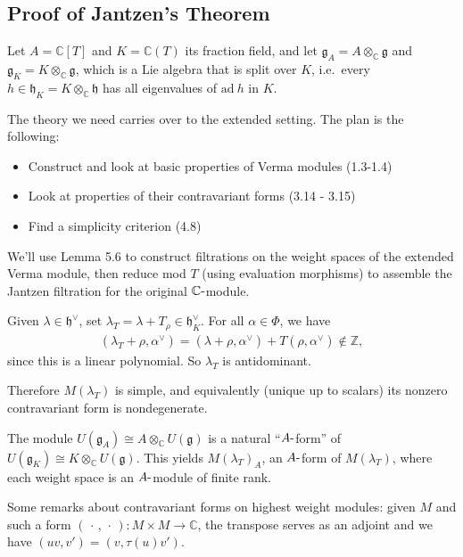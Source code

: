 \documentclass[11pt]{scrartcl}
\theoremstyle{definition}
\theoremstyle{theorem}
\theoremstyle{proof}
\theoremstyle{definition}
\theoremstyle{break}
\theoremstyle{problem}
\providecommand{\tightlist}{%
  \setlength{\itemsep}{0pt}\setlength{\parskip}{0pt}}
\newcommand{\CC}[0]{{\mathbb{C}}}
\newcommand{\ZZ}[0]{{\mathbb{Z}}}
\newcommand{\ad}[0]{\mathrm{ad}~}
\newcommand{\cross}[0]{\times}
\newcommand{\dash}[0]{{\hbox{-}}}
\newcommand{\dual}[0]{^\vee}
\newcommand{\lieg}[0]{{\mathfrak{g}}}
\newcommand{\lieh}[0]{{\mathfrak{h}}}
\newcommand{\tensor}[0]{\otimes}
\newcommand{\wait}[0]{{\,\cdot\,}}
\renewcommand{\to}[0]{\longrightarrow}
\begin{document}
\hypertarget{proof-of-jantzens-theorem}{%
\subsection{Proof of Jantzen's
Theorem}\label{proof-of-jantzens-theorem}}

Let \(A = \CC[T]\) and \(K = \CC(T)\) its fraction field, and let
\(\lieg_A = A \tensor_\CC \lieg\) and \(\lieg_K = K \tensor_\CC \lieg\),
which is a Lie algebra that is split over \(K\), i.e.~every
\(h\in \lieh_K = K \tensor_\CC \lieh\) has all eigenvalues of \(\ad h\)
in \(K\).

The theory we need carries over to the extended setting. The plan is the
following:

\begin{itemize}
\tightlist
\item
  Construct and look at basic properties of Verma modules (1.3-1.4)
\item
  Look at properties of their contravariant forms (3.14 - 3.15)
\item
  Find a simplicity criterion (4.8)
\end{itemize}

We'll use Lemma 5.6 to construct filtrations on the weight spaces of the
extended Verma module, then reduce mod \(T\) (using evaluation
morphisms) to assemble the Jantzen filtration for the original
\(\CC\dash\)module.

Given \(\lambda \in \lieh\dual\), set
\(\lambda_T = \lambda + T_\rho \in \lieh_K\dual\). For all
\(\alpha\in \Phi\), we have \begin{align*}
(\lambda_T  + \rho, \alpha\dual) =
(\lambda + \rho , \alpha\dual) + T(\rho, \alpha\dual) \not\in \ZZ
,\end{align*} since this is a linear polynomial. So \(\lambda_T\) is
antidominant.

Therefore \(M(\lambda_T)\) is simple, and equivalently (unique up to
scalars) its nonzero contravariant form is nondegenerate.

The module \(U(\lieg_A) \cong A \tensor_\CC U(\lieg)\) is a natural
``\(A\dash\)form'' of \(U(\lieg_K) \cong K \tensor_\CC U(\lieg)\). This
yields \(M(\lambda_T)_A\), an \(A\dash\)form of \(M(\lambda_T)\), where
each weight space is an \(A\dash\)module of finite rank.

Some remarks about contravariant forms on highest weight modules: given
\(M\) and such a form \((\wait, \wait): M\cross M \to \CC\), the
transpose serves as an adjoint and we have
\((uv, v') = (v, \tau(u) v')\).
\end{document}
